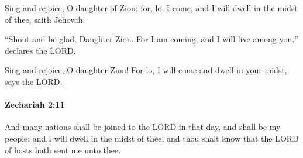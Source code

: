 			\begin{versebox}
					\item[BHS] 
					\item[LXX] 
					\item[ASV] Sing and rejoice, O daughter of Zion; for, lo, I come, and I will dwell in the midst of thee, saith Jehovah.
					\item[NIV] “Shout and be glad, Daughter Zion. For I am coming, and I will live among you,” declares the LORD.
					\item[NRSV] Sing and rejoice, O daughter Zion! For lo, I will come and dwell in your midst, says the LORD.
			\end{versebox}

		\paragraph{Zechariah 2:11} %
			\label{ZECHARIAH-2-11}

			And many nations shall be joined to the LORD in that day, and shall be my people: and I will dwell in the midst of thee, and thou shalt know that the LORD of hosts hath sent me unto thee.

